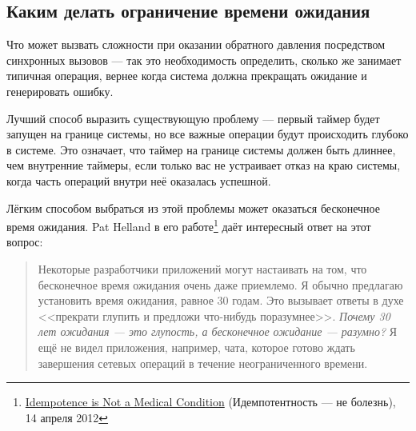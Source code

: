   
\subsection{Каким делать ограничение времени ожидания}

Что может вызвать сложности при оказании обратного давления посредством синхронных вызовов --- так это необходимость определить, сколько же занимает типичная операция, вернее когда система должна прекращать ожидание и генерировать ошибку.

Лучший способ выразить существующую проблему --- первый таймер будет запущен на границе системы, но все важные операции будут происходить глубоко в системе. Это означает, что таймер на границе системы должен быть длиннее, чем внутренние таймеры, если только вас не устраивает отказ на краю системы, когда часть операций внутри неё оказалась успешной.

Лёгким способом выбраться из этой проблемы может оказаться бесконечное время ожидания. Pat Helland в его работе\footnote{\href{http://queue.acm.org/detail.cfm?id=2187821}{Idempotence is Not a Medical Condition} (Идемпотентность --- не болезнь), 14 апреля 2012} даёт интересный ответ на этот вопрос:

\begin{quote}
Некоторые разработчики приложений могут настаивать на том, что бесконечное время ожидания очень даже приемлемо. Я обычно предлагаю установить время ожидания, равное 30 годам. Это вызывает ответы в духе <<прекрати глупить и предложи что-нибудь поразумнее>>. \emph{Почему 30 лет ожидания --- это глупость, а бесконечное ожидание --- разумно?} Я ещё не видел приложения, например, чата, которое готово ждать завершения сетевых операций в течение неограниченного времени.
\end{quote}

